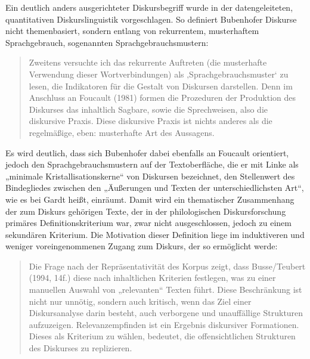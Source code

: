 Ein deutlich anders ausgerichteter Diskursbegriff wurde in der datengeleiteten, quantitativen Diskurslinguistik vorgeschlagen. So definiert Bubenhofer Diskurse nicht themenbasiert, sondern entlang von rekurrentem, musterhaftem Sprachgebrauch, sogenannten Sprachgebrauchsmustern:

\begin{quote}
Zweitens versuchte ich das rekurrente Auftreten (die musterhafte Verwendung dieser Wortverbindungen) als ‚Sprachgebrauchsmuster` zu lesen, die Indikatoren für die Gestalt von Diskursen darstellen. Denn im Anschluss an Foucault (1981) formen die Prozeduren der Produktion des Diskurses das inhaltlich Sagbare, sowie die Sprechweisen, also die diskursive Praxis. Diese diskursive Praxis ist nichts anderes als die regelmäßige, eben: musterhafte Art des Aussagens. \autocite[309]{bubenhoferSprachgebrauchsmusterKorpuslinguistikAls2009}
\end{quote}

Es wird deutlich, dass sich Bubenhofer dabei ebenfalls an Foucault orientiert, jedoch den Sprachgebrauchsmustern auf der Textoberfläche, die er mit Linke \autocite*[40]{linkeBegriffsgeschichteDiskursgeschichteSprachgebrauchsgeschichte2003} als „minimale Kristallisationskerne`` von Diskursen bezeichnet, den Stellenwert des Bindegliedes zwischen den „Äußerungen und Texten der unterschiedlichsten Art``, wie es bei Gardt \autocite*[28]{gardtDiskursanalyseAktuellerTheoretischer2007} heißt, einräumt. Damit wird ein thematischer Zusammenhang der zum Diskurs gehörigen Texte, der in der philologischen Diskursforschung primäres Definitionskriterium war, zwar nicht ausgeschlossen, jedoch zu einem sekundären Kriterium. Die Motivation dieser Definition liege im induktiveren und weniger voreingenommenen Zugang zum Diskurs, der so ermöglicht werde:

\begin{quote}
Die Frage nach der Repräsentativität des Korpus zeigt, dass Busse{\slash}Teubert (1994, 14f.) diese nach inhaltlichen Kriterien festlegen, was zu einer manuellen Auswahl von „relevanten`` Texten führt. Diese Beschränkung ist nicht nur unnötig, sondern auch kritisch, wenn das Ziel einer Diskursanalyse darin besteht, auch verborgene und unauffällige Strukturen aufzuzeigen. Relevanzempfinden ist ein Ergebnis diskursiver Formationen. Dieses als Kriterium zu wählen, bedeutet, die offensichtlichen Strukturen des Diskurses zu replizieren. \autocite[36]{bubenhoferSprachgebrauchsmusterKorpuslinguistikAls2009}
\end{quote}

